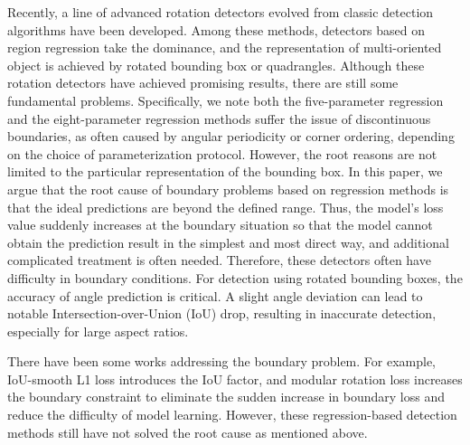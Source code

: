 \documentclass[10pt,journal,compsoc]{IEEEtran}
\begin{document}
Recently, a line of advanced rotation detectors evolved from classic detection algorithms \cite{girshick2015fast,ren2015faster,lin2017feature,lin2017focal,dai2016r} have been developed. Among these methods, detectors based on region regression take the dominance, and the representation of multi-oriented object is achieved by rotated bounding box or quadrangles. Although these rotation detectors have achieved promising results, there are still some fundamental problems. Specifically, we note both the five-parameter regression \cite{yang2019scrdet,ma2018arbitrary,ding2018learning} and the eight-parameter regression \cite{liao2018textboxes++, liu2019omnidirectional, qian2021learning, xu2020gliding} methods suffer the issue of discontinuous boundaries, as often caused by angular periodicity or corner ordering, depending on the choice of parameterization protocol. However, the root reasons are not limited to the particular representation of the bounding box. In this paper, we argue that the root cause of boundary problems based on regression methods is that the ideal predictions are beyond the defined range. Thus, the model's loss value suddenly increases at the boundary situation so that the model cannot obtain the prediction result in the simplest and most direct way, and additional complicated treatment is often needed. Therefore, these detectors often have difficulty in boundary conditions. For detection using rotated bounding boxes, the accuracy of angle prediction is critical. A slight angle deviation can lead to notable Intersection-over-Union (IoU) drop, resulting in inaccurate detection, especially for large aspect ratios. 
	
There have been some works addressing the boundary problem. For example, IoU-smooth L1 loss \cite{yang2019scrdet} introduces the IoU factor, and modular rotation loss \cite{qian2021learning} increases the boundary constraint to eliminate the sudden increase in boundary loss and reduce the difficulty of model learning. However, these regression-based detection methods still have not solved the root cause as mentioned above. 
\end{document}
